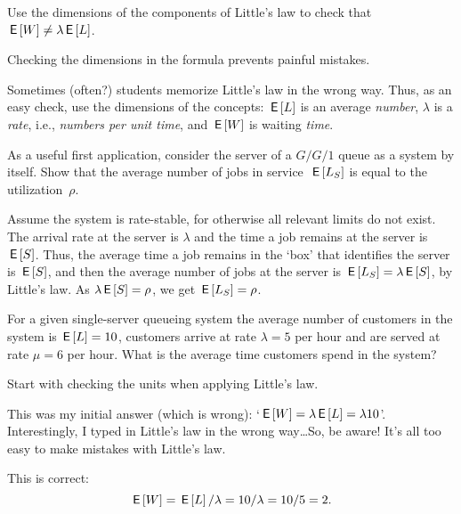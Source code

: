 \begin{exercise}
  Use the dimensions of the components of Little's law to check that $\,\mathsf{E}\left[W\right] \neq \lambda \,\mathsf{E}\left[L\right]$.
  \begin{hint}
Checking the dimensions in the formula  prevents painful mistakes.
  \end{hint}
  \begin{solution}
  Sometimes (often?) students memorize Little's law in the wrong
  way. Thus, as an easy check, use the dimensions of the concepts:
  $\,\mathsf{E}\left[L\right]$ is an average \emph{number}, $\lambda$ is a \emph{rate},
  i.e., \emph{numbers per unit time}, and $\,\mathsf{E}\left[W\right]$ is waiting
  \emph{time}. 
  \end{solution}
\end{exercise}



\begin{exercise}
As a useful first application, consider the server of a $G/G/1$ queue
as a system by itself. Show that the average number of jobs in service~$\,\mathsf{E}\left[L_S\right]$ is equal to the utilization~$\rho$. 
\begin{solution}
 Assume the system is rate-stable, for otherwise
all relevant limits do not exist.  The arrival rate at the server is
$\lambda$ and the time a job remains at the server is $\,\mathsf{E}\left[S\right]$. Thus, the average time a job remains in the `box' that identifies the server is $\,\mathsf{E}\left[S\right]$, and then the average number of jobs at the server is $\,\mathsf{E}\left[L_S\right] = \lambda \,\mathsf{E}\left[S\right]$, by Little's law. As $\lambda \,\mathsf{E}\left[S\right] = \rho$, we get
$\,\mathsf{E}\left[L_S\right] = \rho$.
\end{solution}
\end{exercise}


\begin{exercise}
  For a given single-server queueing system the average number of
  customers in the system is $\,\mathsf{E}\left[L\right] = 10$, customers arrive at rate
  $\lambda=5$ per hour and are served at rate $\mu=6$ per hour.
 What is the average time customers spend in the system?
  \begin{hint}
Start with checking the units when applying Little's law.
  \end{hint}
    \begin{solution}
 This was my initial answer (which is wrong):
        `$\,\mathsf{E}\left[W\right] = \lambda \,\mathsf{E}\left[L\right] = \lambda 10$'.  Interestingly, I typed
        in Little's law in the wrong way\ldots So, be aware! It's all
        too easy to make mistakes with Little's law.

    This is correct: 
    \begin{equation*}
      \,\mathsf{E}\left[W\right] = \,\mathsf{E}\left[L\right]/\lambda = 10/\lambda = 10/5 = 2.
    \end{equation*}
    \end{solution}
\end{exercise}

